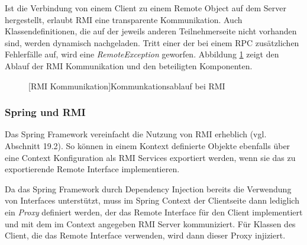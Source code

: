 Ist die Verbindung von einem Client zu einem Remote Object auf dem Server
hergestellt, erlaubt \ac{RMI} eine transparente Kommunikation. Auch
Klassendefinitionen, die auf der jeweils anderen Teilnehmerseite nicht
vorhanden sind, werden dynamisch nachgeladen. Tritt einer der bei einem
\ac{RPC} zusätzlichen Fehlerfälle auf, wird eine \emph{RemoteException}
geworfen. Abbildung \ref{ill:rmi} zeigt den Ablauf der \ac{RMI}
Kommunikation und den beteiligten Komponenten.

\begin{figure}[bth]
	[RMI Kommunikation]{Kommunkationsablauf bei
	RMI\footnotemark}
	\label{ill:rmi}
\end{figure}

\subsubsection{Spring und RMI}
Das Spring Framework vereinfacht die Nutzung von \ac{RMI} erheblich (vgl.
\cite{spring:reference} Abschnitt 19.2). So können in einem Kontext definierte
Objekte ebenfalls über eine Context Konfiguration als \ac{RMI} Services
exportiert werden, wenn sie das zu exportierende Remote Interface implementieren.

Da das Spring Framework durch Dependency Injection bereits die Verwendung von
Interfaces unterstützt, muss im Spring Context der Clientseite dann lediglich
ein \emph{Proxy} definiert werden, der das Remote Interface für den Client
implementiert und mit dem im Context angegeben \ac{RMI} Server
kommuniziert. Für Klassen des Client, die das Remote Interface verwenden, wird
dann dieser Proxy injiziert.

